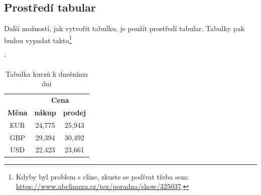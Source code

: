 \documentclass[a4paper,11pt,draft]{article}
\begin{document}
	\subsection{Prostředí {\ttfamily tabular}} 	
	
	Další možností, jak vytvořit tabulku, je použít prostředí {\ttfamily tabular}. Tabulky pak budou vypadat takto\footnote{Kdyby byl problem s {\ttfamily cline}, zkuste se podívat třeba sem: \url{https://www.abclinuxu.cz/tex/poradna/show/325037}.}
	
	\catcode`
	\begin{table}[h]
		\centering
		\begin{tabular}{|c|c|c|}
			\hline
			& \multicolumn{2}{c|}{\textbf{Cena}} \\
			\cline{2-3}
			\textbf{Měna} & \textbf{nákup} & \textbf{prodej}\\
			\hline
			EUR & 24,775 & 25,943\\
			GBP & 29,394 & 30,492\\
			USD & 22,423 & 23,661\\
			\hline
	
		\end{tabular} 
		\caption{Tabulka kurzů k dnešnímu dni}
		\label{meny}
	\end{table}
\end{document}
